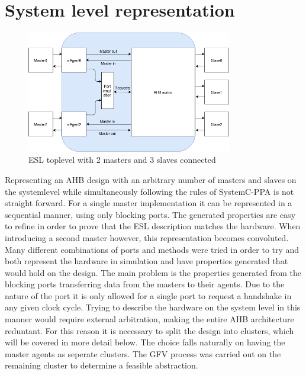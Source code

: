 \section{System level representation}
\label{sec:syslev}
\begin{figure}[hbt]
    \begin{center}
        \includegraphics[width=0.8\textwidth]{figs/ESL/Syslev.png}
    \end{center}
    \caption{ESL toplevel with 2 masters and 3 slaves connected}
    \label{fig:esl_toplev}
\end{figure}
Representing an AHB design with an arbitrary number of masters and slaves on the systemlevel while simultaneously following the rules of SystemC-PPA is not straight forward. For a single master implementation it can be represented in a sequential manner, using only blocking ports. The generated properties are easy to refine in order to prove that the ESL description matches the hardware. When introducing a second master however, this representation becomes convoluted. Many different combinations of ports and methods were tried in order to try and both represent the hardware in simulation and have properties generated that would hold on the design. The main problem is the properties generated from the blocking ports transferring data from the masters to their agents. Due to the nature of the port it is only allowed for a single port to request a handshake in any given clock cycle. Trying to describe the hardware on the system level in this manner would require external arbitration, making the entire AHB architecture reduntant. For this reason it is necessary to split the design into clusters, which will be covered in more detail below. The choice falls naturally on having the master agents as seperate clusters. The GFV process was carried out on the remaining cluster to determine a feasible abstraction. 

 


